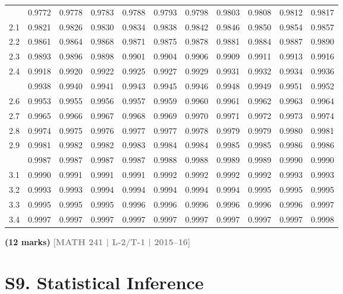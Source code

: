 \documentclass[12pt,a4paper]{article}
\newcommand{\yr}[1]{\hfill\textcolor{gray}{\small\textbf{[#1]}}}
\newcommand{\mk}[1]{\textcolor{orange!70!black}{\small\textbf{(#1 marks)}}}
\begin{document}
\begin{enumerate}
\begin{center}
\begin{longtable}{ccccccccccc}
\addlinespace
2.0 & 0.9772 & 0.9778 & 0.9783 & 0.9788 & 0.9793 & 0.9798 & 0.9803 & 0.9808 & 0.9812 & 0.9817 \\
2.1 & 0.9821 & 0.9826 & 0.9830 & 0.9834 & 0.9838 & 0.9842 & 0.9846 & 0.9850 & 0.9854 & 0.9857 \\
2.2 & 0.9861 & 0.9864 & 0.9868 & 0.9871 & 0.9875 & 0.9878 & 0.9881 & 0.9884 & 0.9887 & 0.9890 \\
2.3 & 0.9893 & 0.9896 & 0.9898 & 0.9901 & 0.9904 & 0.9906 & 0.9909 & 0.9911 & 0.9913 & 0.9916 \\
2.4 & 0.9918 & 0.9920 & 0.9922 & 0.9925 & 0.9927 & 0.9929 & 0.9931 & 0.9932 & 0.9934 & 0.9936 \\
\addlinespace
2.5 & 0.9938 & 0.9940 & 0.9941 & 0.9943 & 0.9945 & 0.9946 & 0.9948 & 0.9949 & 0.9951 & 0.9952 \\
2.6 & 0.9953 & 0.9955 & 0.9956 & 0.9957 & 0.9959 & 0.9960 & 0.9961 & 0.9962 & 0.9963 & 0.9964 \\
2.7 & 0.9965 & 0.9966 & 0.9967 & 0.9968 & 0.9969 & 0.9970 & 0.9971 & 0.9972 & 0.9973 & 0.9974 \\
2.8 & 0.9974 & 0.9975 & 0.9976 & 0.9977 & 0.9977 & 0.9978 & 0.9979 & 0.9979 & 0.9980 & 0.9981 \\
2.9 & 0.9981 & 0.9982 & 0.9982 & 0.9983 & 0.9984 & 0.9984 & 0.9985 & 0.9985 & 0.9986 & 0.9986 \\
\addlinespace
3.0 & 0.9987 & 0.9987 & 0.9987 & 0.9987 & 0.9988 & 0.9988 & 0.9989 & 0.9989 & 0.9990 & 0.9990 \\
3.1 & 0.9990 & 0.9991 & 0.9991 & 0.9991 & 0.9992 & 0.9992 & 0.9992 & 0.9992 & 0.9993 & 0.9993 \\
3.2 & 0.9993 & 0.9993 & 0.9994 & 0.9994 & 0.9994 & 0.9994 & 0.9994 & 0.9995 & 0.9995 & 0.9995 \\
3.3 & 0.9995 & 0.9995 & 0.9995 & 0.9996 & 0.9996 & 0.9996 & 0.9996 & 0.9996 & 0.9996 & 0.9997 \\
3.4 & 0.9997 & 0.9997 & 0.9997 & 0.9997 & 0.9997 & 0.9997 & 0.9997 & 0.9997 & 0.9997 & 0.9998 \\
\end{longtable}
\end{center}

\mk{12} \yr{MATH 241 | L-2/T-1 | 2015--16}

\end{enumerate}


\section{S9. Statistical Inference}
\label{sec:S9}
\end{document}
